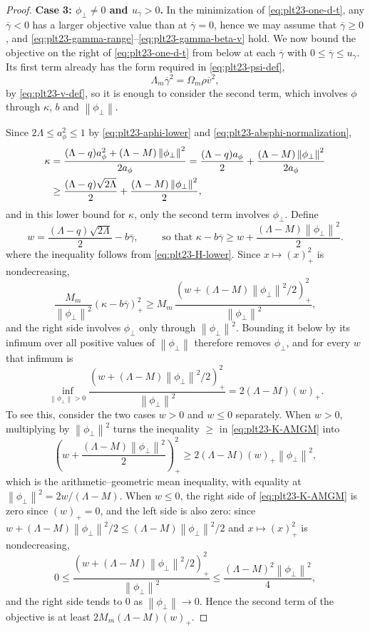 \documentclass[11pt]{article}
\numberwithin{equation}{section}
\newcommand{\norm}[1]{\left\lVert #1\right\rVert}
\newcommand{\pos}[1]{\left(#1\right)_{+}}
\begin{document}
\begin{proof}
  \textbf{Case 3: $\phi_\perp\ne0$ and $u_\gamma>0$.}
  In the minimization of \eqref{eq:plt23-one-d-t}, any $\overline\gamma<0$ has a larger objective value than at $\overline\gamma=0$, hence we may assume that $\overline\gamma\ge0$, and \eqref{eq:plt23-gamma-range}--\eqref{eq:plt23-gamma-beta-v} hold.
  We now bound the objective on the right of \eqref{eq:plt23-one-d-t} from below at each $\overline\gamma$ with $0\le\overline\gamma\le u_\gamma$.
  Its first term already has the form required in \eqref{eq:plt23-psi-def},
  \[
    \Lambda_m\overline\gamma^2=\Omega_m\rho\overline v^2,
  \]
  by \eqref{eq:plt23-v-def}, so it is enough to consider the second term, which involves $\phi$ through $\kappa$, $b$ and $\norm{\phi_\perp}$.

  Since $2\Lambda\le a_\phi^2\le1$ by \eqref{eq:plt23-aphi-lower} and \eqref{eq:plt23-absphi-normalization},
  \begin{align}
    \kappa
    &=\frac{(\Lambda-q)a_\phi^2+(\Lambda-M)\norm{\phi_\perp}^2}{2a_\phi}
    =\frac{(\Lambda-q)a_\phi}{2}+\frac{(\Lambda-M)\norm{\phi_\perp}^2}{2a_\phi}\notag\\
    &\ge\frac{(\Lambda-q)\sqrt{2\Lambda}}{2}
    +\frac{(\Lambda-M)\norm{\phi_\perp}^2}{2},\label{eq:plt23-H-lower}
  \end{align}
  and in this lower bound for $\kappa$, only the second term involves $\phi_\perp$.
  Define
  \[
    w=\frac{(\Lambda-q)\sqrt{2\Lambda}}{2}-b\overline\gamma, \qquad \text{ so that } \kappa-b\overline\gamma\ge w+ \frac{(\Lambda-M)\norm{\phi_\perp}^2}{2}.
  \]
  where the inequality follows from \eqref{eq:plt23-H-lower}.
  Since $x\mapsto\pos x^2$ is nondecreasing,
  \[
    \frac{M_m}{\norm{\phi_\perp}^2}\pos{\kappa-b\overline\gamma}^2
    \ge M_m\,\frac{\pos{w+(\Lambda-M)\norm{\phi_\perp}^2/2}^2}{\norm{\phi_\perp}^2},
  \]
  and the right side involves $\phi_\perp$ only through $\norm{\phi_\perp}^2$.
  Bounding it below by its infimum over all positive values of $\norm{\phi_\perp}$ therefore removes $\phi_\perp$, and for every $w$ that infimum is
  \begin{equation}\label{eq:plt23-K-AMGM}
    \inf_{\norm{\phi_\perp}>0}
    \frac{\pos{w+(\Lambda-M)\norm{\phi_\perp}^2/2}^2}{\norm{\phi_\perp}^2}
    =2(\Lambda-M)\pos w.
  \end{equation}
  To see this, consider the two cases $w>0$ and $w\le0$ separately.
  When $w>0$, multiplying by $\norm{\phi_\perp}^2$ turns the inequality $\ge$ in \eqref{eq:plt23-K-AMGM} into
  \[
    \pos{w+\frac{(\Lambda-M)\norm{\phi_\perp}^2}{2}}^2
    \ge2(\Lambda-M)\pos w\norm{\phi_\perp}^2,
  \]
  which is the arithmetic--geometric mean inequality, with equality at $\norm{\phi_\perp}^2=2w/(\Lambda-M)$.
  When $w\le0$, the right side of \eqref{eq:plt23-K-AMGM} is zero since $\pos w=0$, and the left side is also zero: since $w+(\Lambda-M)\norm{\phi_\perp}^2/2\le(\Lambda-M)\norm{\phi_\perp}^2/2$ and $x\mapsto\pos x^2$ is nondecreasing,
  \[
    0\le\frac{\pos{w+(\Lambda-M)\norm{\phi_\perp}^2/2}^2}{\norm{\phi_\perp}^2}
    \le\frac{(\Lambda-M)^2\norm{\phi_\perp}^2}{4},
  \]
  and the right side tends to $0$ as $\norm{\phi_\perp}\to0$.
  Hence the second term of the objective is at least $2M_m(\Lambda-M)\pos w$.


\end{proof}
\end{document}

